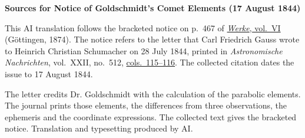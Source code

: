 \clearpage\thispagestyle{empty}
\begin{center}\textbf{Sources for Notice of Goldschmidt’s Comet Elements (17 August 1844)}\end{center}
\noindent This AI translation follows the bracketed notice on p.~467 of \href{https://gdz.sub.uni-goettingen.de/id/PPN236007467}{\textit{Werke}, vol.~VI} (Göttingen, 1874). The notice refers to the letter that Carl Friedrich Gauss wrote to Heinrich Christian Schumacher on 28 July 1844, printed in \textit{Astronomische Nachrichten}, vol.~XXII, no.~512, \href{https://api.digitale-sammlungen.de/iiif/image/v2/bsb10049447_00066/full/1800,/0/default.jpg}{cols.~115--116}. The collected citation dates the issue to 17 August 1844.
\par\smallskip\noindent The letter credits Dr. Goldschmidt with the calculation of the parabolic elements. The journal prints those elements, the differences from three observations, the ephemeris and the coordinate expressions. The collected text gives the bracketed notice. Translation and typesetting produced by AI.
\clearpage

